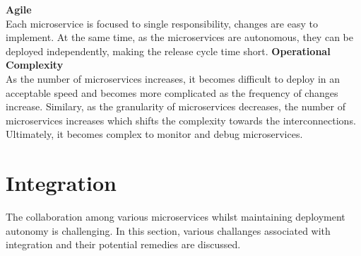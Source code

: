   \begin{multicols}{2}
  \textbf{Agile}\\ Each microservice is focused to single responsibility, changes are easy to implement. At the same time, as the microservices are autonomous, they can be deployed independently, making the release cycle time short.
  \vfill
  \columnbreak
  \textbf{Operational Complexity} \\ As the number of microservices increases, it becomes difficult to deploy in an acceptable speed and becomes more complicated as the frequency of changes increase. Similary, as the granularity of microservices decreases, the number of microservices increases which shifts the complexity towards the interconnections. Ultimately, it becomes complex to monitor and debug microservices.
   \end{multicols}

\section{Integration}\label{section:challanges_of_microservices_architecture/integration}
The collaboration among various microservices whilst maintaining deployment autonomy is challenging. In this section, various challanges associated with integration and their potential remedies are discussed.
